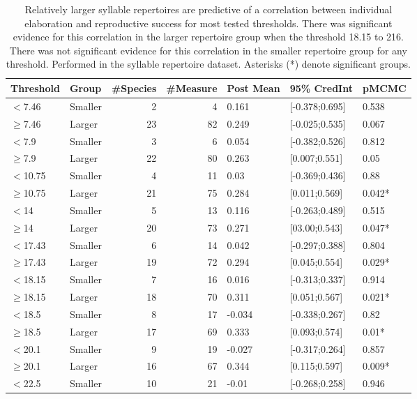 \documentclass{article}
\begin{document}
  \begin{table}[H]
  \centering
  \caption{Relatively larger syllable repertoires are predictive of a correlation between individual elaboration and reproductive success for most tested thresholds. There was significant evidence for this correlation in the  larger  repertoire  group  when  the  threshold  18.15  to  216. There  was  not  significant  evidence  for  this correlation in the smaller repertoire group for any threshold.  Performed in the syllable repertoire dataset. Asterisks (*) denote significant groups.} 
  \begin{tabular}{llrrlll}
  \hline
  Threshold & Group & \#Species & \#Measure & Post Mean & 95\% CredInt & pMCMC \\ 
  \hline
  $<$7.46 & Smaller &   2 & 4 & 0.161 & [-0.378;0.695] & 0.538 \\ 
  $\ge$7.46 & Larger &  23 & 82 & 0.249 & [-0.025;0.535] & 0.067 \\ 
  $<$7.9 & Smaller &   3 & 6 & 0.054 & [-0.382;0.526] & 0.812 \\ 
  $\ge$7.9 & Larger &  22 & 80 & 0.263 & [0.007;0.551] & 0.05 \\ 
  $<$10.75 & Smaller &   4 & 11 & 0.03 & [-0.369;0.436] & 0.88 \\ 
  $\ge$10.75 & Larger &  21 & 75 & 0.284 & [0.011;0.569] & 0.042* \\ 
  $<$14 & Smaller &   5 & 13 & 0.116 & [-0.263;0.489] & 0.515 \\ 
  $\ge$14 & Larger &  20 & 73 & 0.271 & [03.00;0.543] & 0.047* \\ 
  $<$17.43 & Smaller &   6 & 14 & 0.042 & [-0.297;0.388] & 0.804 \\ 
  $\ge$17.43 & Larger &  19 & 72 & 0.294 & [0.045;0.554] & 0.029* \\ 
  $<$18.15 & Smaller &   7 & 16 & 0.016 & [-0.313;0.337] & 0.914 \\ 
  $\ge$18.15 & Larger &  18 & 70 & 0.311 & [0.051;0.567] & 0.021* \\ 
  $<$18.5 & Smaller &   8 & 17 & -0.034 & [-0.338;0.267] & 0.82 \\ 
  $\ge$18.5 & Larger &  17 & 69 & 0.333 & [0.093;0.574] & 0.01* \\ 
  $<$20.1 & Smaller &   9 & 19 & -0.027 & [-0.317;0.264] & 0.857 \\ 
  $\ge$20.1 & Larger &  16 & 67 & 0.344 & [0.115;0.597] & 0.009* \\ 
  $<$22.5 & Smaller &  10 & 21 & -0.01 & [-0.268;0.258] & 0.946 \\ 

\end{tabular}
\end{table}
\end{document}
